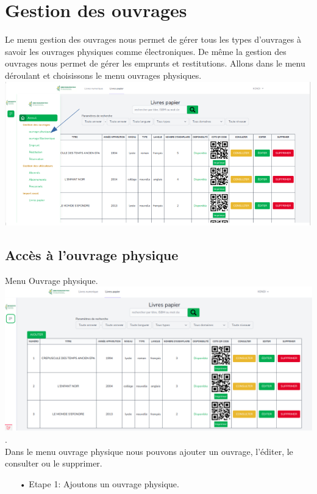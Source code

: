\documentclass[12pt,a4paper]{article}
\begin{document}
\newpage
\section{Gestion des ouvrages}
Le menu gestion des ouvrages nous permet de gérer tous les types d'ouvrages à savoir les ouvrages physiques comme électroniques. De même la gestion des ouvrages nous permet de gérer les emprunts et restitutions.
Allons dans le menu déroulant et choisissons le menu ouvrages physiques. \\
\includegraphics[scale=0.7]{images/TableauDeBord2.png}

\subsection{Accès à l'ouvrage physique}
Menu Ouvrage physique.\\

\includegraphics[scale=0.35]{images/SelectOuvragesPhysique.png}. \\

Dans le menu ouvrage physique nous pouvons ajouter un ouvrage, l'éditer, le consulter ou le supprimer.

\begin{itemize}
\item[•]Etape 1: Ajoutons un ouvrage physique.
\end{itemize}
\end{document}
